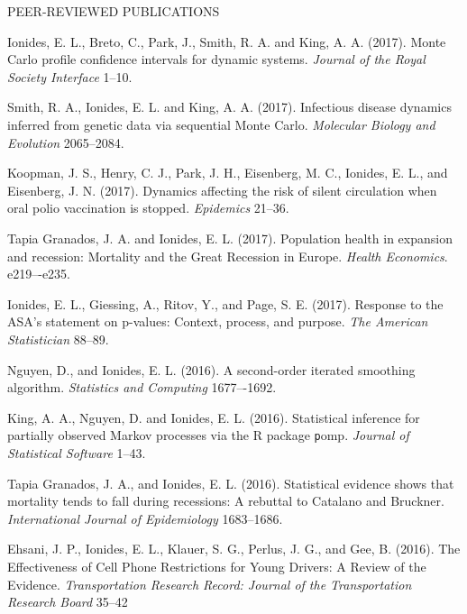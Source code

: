 \begin{reflist}{PEER-REVIEWED PUBLICATIONS}
\item Ionides, E. L., Breto, C., Park, J., Smith, R. A. and King, A. A. (2017). Monte Carlo profile confidence intervals for dynamic systems. {\it Journal of the Royal Society Interface} {}{\separator}1--10.

\item Smith, R. A., Ionides, E. L. and King, A. A. (2017). Infectious disease dynamics inferred from genetic data via sequential Monte Carlo. {\it Molecular Biology and Evolution} {}{\separator}2065--2084.

\item Koopman, J. S., Henry, C. J., Park, J. H., Eisenberg, M. C., Ionides, E. L., and Eisenberg, J. N. (2017). Dynamics affecting the risk of silent circulation when oral polio vaccination is stopped. {\it Epidemics} {}{\separator}21--36. 

\item Tapia Granados, J. A. and Ionides, E. L. (2017). Population health in expansion and recession: Mortality and the Great Recession in Europe. {\it Health Economics}. {}{\separator}e219–-e235.

\item Ionides, E. L., Giessing, A., Ritov, Y., and Page, S. E. (2017).
Response to the ASA's statement on p-values: Context, process, and purpose. {\em The American Statistician} {}{\separator}88--89.

\item Nguyen, D., and Ionides, E. L. (2016). A second-order iterated smoothing algorithm. {\em Statistics and Computing} {}{\separator}1677–-1692.

\item King, A. A., Nguyen, D. and Ionides, E. L. (2016). Statistical inference for partially observed Markov processes via the R package {\texttt pomp}. {\em Journal of Statistical Software} {}{\separator}1--43.

\item  Tapia Granados, J. A.,  and Ionides, E. L. (2016). Statistical evidence shows that mortality tends to fall during recessions: A rebuttal to Catalano and Bruckner. {\em International Journal of Epidemiology} {}{\separator}1683--1686.

\item Ehsani, J. P.,  Ionides, E. L., Klauer, S. G., Perlus,  J. G., and Gee, B. (2016). The Effectiveness of Cell Phone Restrictions for Young Drivers: A Review of the Evidence. {\em Transportation Research Record: Journal of the Transportation Research Board} {}{\separator}35–42


\end{reflist}
